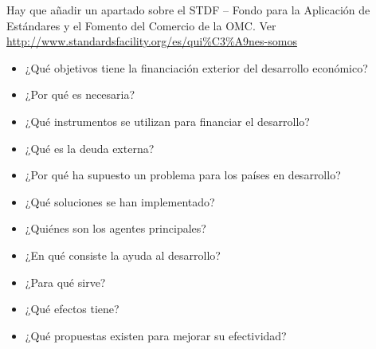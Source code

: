 \documentclass{nuevotema}
\begin{document}
\ideaclave

Hay que añadir un apartado sobre el STDF -- Fondo para la Aplicación de Estándares y el Fomento del Comercio de la OMC. Ver \url{http://www.standardsfacility.org/es/qui\%C3\%A9nes-somos}


\begin{itemize}
	\item ¿Qué objetivos tiene la financiación exterior del desarrollo económico?
	\item ¿Por qué es necesaria?
	\item ¿Qué instrumentos se utilizan para financiar el desarrollo?
	\item ¿Qué es la deuda externa?
	\item ¿Por qué ha supuesto un problema para los países en desarrollo?
	\item ¿Qué soluciones se han implementado?
	\item ¿Quiénes son los agentes principales?
	\item ¿En qué consiste la ayuda al desarrollo?
	\item ¿Para qué sirve?
	\item ¿Qué efectos tiene?
	\item ¿Qué propuestas existen para mejorar su efectividad?
\end{itemize}

\esquemacorto
\end{document}
